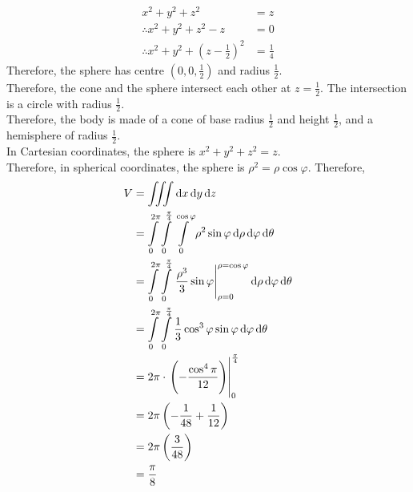 \documentclass[fleqn, a4paper, 8pt, twoside]{amsart}
\theoremstyle{definition}
\theoremstyle{bluedefinition}
\theoremstyle{redtheorem}
\begin{document}
\begin{multicols}{2}
\begin{spacing}{0.7}
\begin{solution}
	\begin{align*}
		x^2 + y^2 + z^2                                         & = z \\
		\therefore x^2 + y^2 + z^2 - z                          & = 0 \\
		\therefore x^2 + y^2 + \left( z - \frac{1}{2} \right)^2 & = \frac{1}{4}
	\end{align*}
	Therefore, the sphere has centre $\left( 0 , 0 , \frac{1}{2} \right)$ and radius $\frac{1}{2}$.\\
	Therefore, the cone and the sphere intersect each other at $z = \frac{1}{2}$.
	The intersection is a circle with radius $\frac{1}{2}$.\\
	Therefore, the body is made of a cone of base radius $\frac{1}{2}$ and height $\frac{1}{2}$, and a hemisphere of radius $\frac{1}{2}$.\\
	In Cartesian coordinates, the sphere is $x^2 + y^2 + z^2 = z$.\\
	Therefore, in spherical coordinates, the sphere is $\rho^2 = \rho \cos \varphi$.
	Therefore,
	\begin{align*}
		V & = \iiint \dif x \dif y \dif z                                                                                                                                              \\
                  & = \int\limits_{0}^{2 \pi} \int\limits_{0}^{\frac{\pi}{4}} \int\limits_{0}^{\cos \varphi} \rho^2 \sin \varphi \dif \rho \dif \varphi \dif \theta                            \\
                  & = \int\limits_{0}^{2 \pi} \int\limits_{0}^{\frac{\pi}{4}} \left. \frac{\rho^3}{3} \sin \varphi \right|_{\rho = 0}^{\rho = \cos \varphi} \dif \rho \dif \varphi \dif \theta \\
                  & = \int\limits_{0}^{2 \pi} \int\limits_{0}^{\frac{\pi}{4}} \frac{1}{3} \cos^3 \varphi \sin \varphi \dif \varphi \dif \theta                                                 \\
                  & = 2 \pi \cdot \left. \left( -\frac{\cos^4 \pi}{12} \right) \right|_{0}^{\frac{\pi}{4}}                                                                                     \\
                  & = 2 \pi \left( -\frac{1}{48} + \frac{1}{12} \right)                                                                                                                        \\
                  & = 2 \pi \left( \frac{3}{48} \right)                                                                                                                                        \\
                  & = \frac{\pi}{8}
	\end{align*}
\end{solution}


\end{spacing}
\end{multicols}
\end{document}
